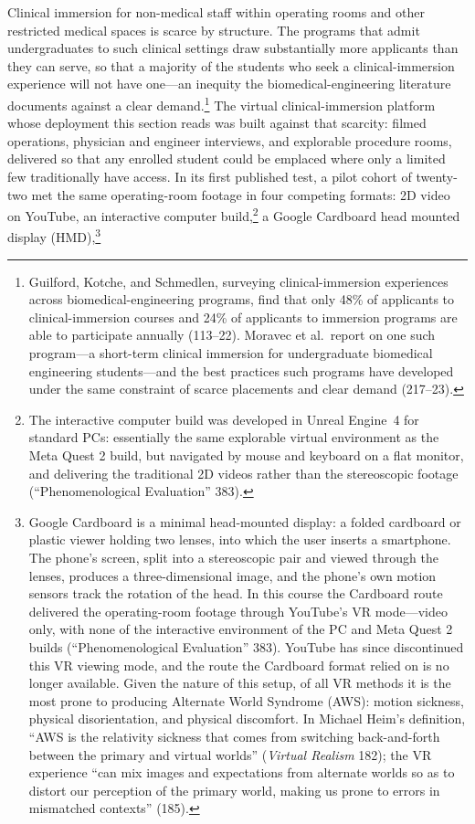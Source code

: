 Clinical immersion for non-medical staff within operating rooms and other
restricted medical spaces is scarce by structure. The programs that admit
undergraduates to such clinical settings draw substantially more applicants than
they can serve, so that a majority of the students who seek a clinical-immersion
experience will not have one---an inequity the biomedical-engineering literature
documents against a clear demand.\footnote{Guilford, Kotche, and Schmedlen,
surveying clinical-immersion experiences across biomedical-engineering programs,
find that only 48\% of applicants to clinical-immersion courses and 24\% of
applicants to immersion programs are able to participate annually (113--22).
Moravec et al.\ report on one such program---a short-term clinical immersion for
undergraduate biomedical engineering students---and the best practices such
programs have developed under the same constraint of scarce placements and clear
demand (217--23).} The virtual clinical-immersion platform whose deployment this
section reads was built against that scarcity: filmed operations, physician and
engineer interviews, and explorable procedure rooms, delivered so that any
enrolled student could be emplaced where only a limited few traditionally have
access. In its first published test, a pilot cohort of twenty-two
met the same operating-room footage in four competing formats: 2D video on
YouTube, an interactive computer build,\footnote{The interactive computer build
was developed in Unreal Engine~4 for standard PCs: essentially the same
explorable virtual environment as the Meta Quest 2 build, but navigated by mouse
and keyboard on a flat monitor, and delivering the traditional 2D videos rather
than the stereoscopic footage (``Phenomenological Evaluation'' 383).} a Google
Cardboard head mounted display (HMD),\footnote{Google Cardboard is a minimal
head-mounted display: a folded cardboard or plastic viewer holding two lenses,
into which the user inserts a smartphone. The phone's screen, split into a
stereoscopic pair and viewed through the lenses, produces a three-dimensional
image, and the phone's own motion sensors track the rotation of the head. In
this course the Cardboard route delivered the operating-room footage through
YouTube's VR mode---video only, with none of the interactive environment of the
PC and Meta Quest 2 builds (``Phenomenological Evaluation'' 383). YouTube has
since discontinued this VR viewing mode, and the route the Cardboard format
relied on is no longer available. Given the nature of this setup, of all VR methods it is the most prone to producing
Alternate World Syndrome (AWS): motion sickness, physical disorientation, and
physical discomfort. In Michael Heim's definition, ``AWS is the relativity
sickness that comes from switching back-and-forth between the primary and
virtual worlds'' (\textit{Virtual Realism} 182); the VR experience ``can mix
images and expectations from alternate worlds so as to distort our perception of
the primary world, making us prone to errors in mismatched contexts'' (185).}
